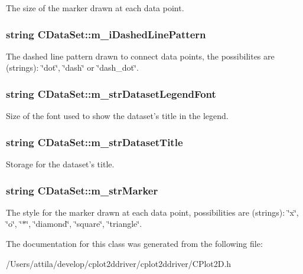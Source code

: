 The size of the marker drawn at each data point. \hypertarget{class_c_data_set_ad22fc1706abf604a04cc92a42afcb2d9}{
\subsubsection[{m\-\_\-i\-Dashed\-Line\-Pattern}]{\setlength{\rightskip}{0pt plus 5cm}string C\-Data\-Set\-::m\-\_\-i\-Dashed\-Line\-Pattern\hspace{0.3cm}{\ttfamily [protected]}}}\label{class_c_data_set_ad22fc1706abf604a04cc92a42afcb2d9}
The dashed line pattern drawn to connect data points, the possibilites are (strings)\-: \char`\"{}dot\char`\"{}, \char`\"{}dash\char`\"{} or \char`\"{}dash\-\_\-dot\char`\"{}. \hypertarget{class_c_data_set_ab813c1d367d265ae6c333351267722f5}{
\subsubsection[{m\-\_\-str\-Dataset\-Legend\-Font}]{\setlength{\rightskip}{0pt plus 5cm}string C\-Data\-Set\-::m\-\_\-str\-Dataset\-Legend\-Font\hspace{0.3cm}{\ttfamily [protected]}}}\label{class_c_data_set_ab813c1d367d265ae6c333351267722f5}
Size of the font used to show the dataset's title in the legend. \hypertarget{class_c_data_set_a02b0ac7182110c68f365190bd4a5a518}{
\subsubsection[{m\-\_\-str\-Dataset\-Title}]{\setlength{\rightskip}{0pt plus 5cm}string C\-Data\-Set\-::m\-\_\-str\-Dataset\-Title\hspace{0.3cm}{\ttfamily [protected]}}}\label{class_c_data_set_a02b0ac7182110c68f365190bd4a5a518}
Storage for the dataset's title. \hypertarget{class_c_data_set_aa02d9ec8b506a501fe7038d49d3b687a}{
\subsubsection[{m\-\_\-str\-Marker}]{\setlength{\rightskip}{0pt plus 5cm}string C\-Data\-Set\-::m\-\_\-str\-Marker\hspace{0.3cm}{\ttfamily [protected]}}}\label{class_c_data_set_aa02d9ec8b506a501fe7038d49d3b687a}
The style for the marker drawn at each data point, possibilities are (strings)\-: \char`\"{}x\char`\"{}, \char`\"{}o\char`\"{}, \char`\"{}$\ast$\char`\"{}, \char`\"{}diamond\char`\"{}, \char`\"{}square\char`\"{}, \char`\"{}triangle\char`\"{}. 

The documentation for this class was generated from the following file\-:\begin{DoxyCompactItemize}
\item 
/\-Users/attila/develop/cplot2ddriver/cplot2ddriver/C\-Plot2\-D.\-h\end{DoxyCompactItemize}
